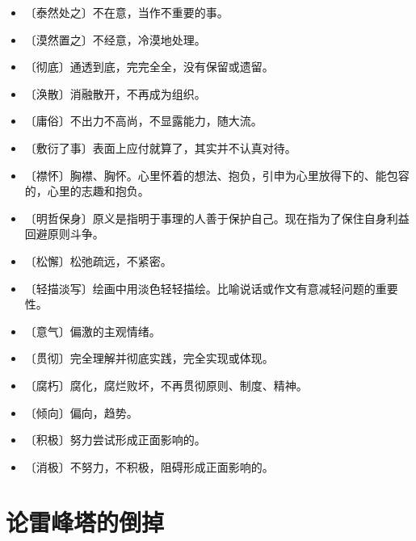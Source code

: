 \documentclass[12pt,UTF-8,openany]{ctexbook}
\begin{document}
\begin{itemize}
    \setlength\itemsep{-0.2em}
    \item 〔泰然处之〕不在意，当作不重要的事。
    \item 〔漠然置之〕不经意，冷漠地处理。
    \item 〔彻底〕通透到底，完完全全，没有保留或遗留。
    \item 〔涣散〕消融散开，不再成为组织。
    \item 〔庸俗〕不出力不高尚，不显露能力，随大流。
    \item 〔敷衍了事〕表面上应付就算了，其实并不认真对待。
    \item 〔襟怀〕胸襟、胸怀。心里怀着的想法、抱负，引申为心里放得下的、能包容的，心里的志趣和抱负。
    \item 〔明哲保身〕原义是指明于事理的人善于保护自己。现在指为了保住自身利益回避原则斗争。
    \item 〔松懈〕松弛疏远，不紧密。
    \item 〔轻描淡写〕绘画中用淡色轻轻描绘。比喻说话或作文有意减轻问题的重要性。
    \item 〔意气〕偏激的主观情绪。
    \item 〔贯彻〕完全理解并彻底实践，完全实现或体现。
    \item 〔腐朽〕腐化，腐烂败坏，不再贯彻原则、制度、精神。
    \item 〔倾向〕偏向，趋势。
    \item 〔积极〕努力尝试形成正面影响的。
    \item 〔消极〕不努力，不积极，阻碍形成正面影响的。
\end{itemize}

\chapter{论雷峰塔的倒掉}
\end{document}
